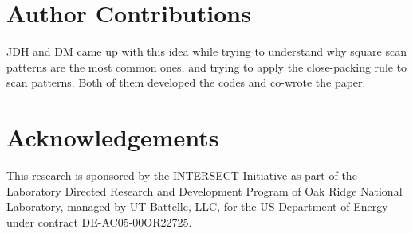 \documentclass[aip, amsmath, amssymb, nobibnotes, nofootinbib, citeautoscript, reprint, superscriptaddress]{revtex4-2}
\begin{document}
    \section{\label{sec:contribs}Author Contributions}
    JDH and DM came up with this idea while trying to understand why square scan patterns are the most common ones, and trying to apply the close-packing rule to scan patterns. Both of them developed the codes and co-wrote the paper.

    \section{\label{sec:acknowledgement}Acknowledgements}

    This research is sponsored by the INTERSECT Initiative as part of the Laboratory Directed Research and Development Program of Oak Ridge National Laboratory, managed by UT-Battelle, LLC, for the US Department of Energy under contract DE-AC05-00OR22725. 
    
    
\end{document}
